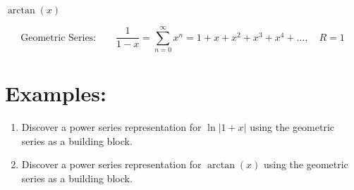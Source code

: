 \( \arctan(x) \)


\pagebreak

\[
\text{Geometric Series:}\qquad  \frac{1}{1-x}  = \sum_{n=0}^\infty x^{n}= 1+x+x^2+x^3+x^4+\ldots , \quad R=1
\]


\section*{Examples:}



\begin{enumerate}[{Example } 1:]
\addtocounter{enumi}{3}

\item Discover a power series representation for \(\ln|1+x|\) using the geometric series as a building block.
\vfill


\item Discover a power series representation for \(\arctan(x)\) using the geometric series as a building block.
\vfill

%
\end{enumerate}

%
%
%
%
%
%
%
%
%
%
%
%
%


